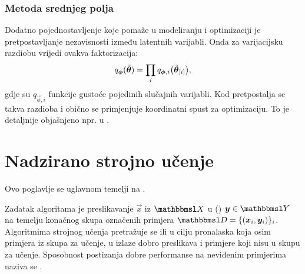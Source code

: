 \documentclass[utf8, diplomski, lmodern]{fer}
\begin{document}
\subsection{Metoda srednjeg polja}

Dodatno pojednostavljenje koje pomaže u modeliranju i optimizaciji je pretpostavljanje nezavisnosti između latentnih varijabli. Onda za varijacijsku razdiobu vrijedi ovakva faktorizacija:
\begin{align}
q_{\vec\phi}\del{\tilde{\vec\theta}} = \prod_i q_{\vec\phi,i}\del{\tilde{\vec\theta}_\ind{i}},
\end{align}
gdje su $q_{\vec\phi,i}$ funkcije gustoće pojedinih slučajnih varijabli. Kod  pretpostalja se takva razdioba i obično se primjenjuje koordinatni spust za optimizaciju. To je detaljnije objašnjeno npr. u \citet{Murphy:2012:MLPP}.

\iffalse
Neka je, radi kraćeg zapisa, $t\del{\tilde{\vec\theta}} \coloneqq \p(\rvec\theta=\tilde{\vec\theta},\rvec x=\vec x)$. Uz aproksimaciju srednjeg polja donja varijacijska granica postaje
\begin{align}
L_{\vec x}\del{\tilde{\rvec\theta}} 
&= \E_{\tilde{\vec\theta}\sim q_{\vec\phi}}\del{\ln t\del{\tilde{\vec\theta}} - \ln q\del{\tilde{\vec\theta}}}
\\
&= \int\dif{\tilde{\vec\theta}} \del{\prod_i q_i(\tilde{z}_i)}\del{\ln t\del{\tilde{\vec\theta}} - \sum_j \ln q_j(\tilde{z}_j)}
\text{.}
\end{align}
\fi



\chapter{Nadzirano strojno učenje} \label{chap:nadzirano-strojno-ucenje}

Ovo poglavlje se uglavnom temelji na \citet{Snajder:2014:SU,Goodfellow:2016:DL}.

Zadatak algoritama  je preslikavanje  $\vec x$ iz  $\set{X}$ u  () $\vec y\in\set{Y}$ na temelju konačnog skupa označenih primjera $\set{D} = \cbr{\del{\vec x_i,\vec y_i}}_{i}$. Algoritmima strojnog učenja pretražuje se  ili  u cilju pronalaska  koja osim primjera iz skupa za učenje, u izlaze dobro preslikava i primjere koji nisu u skupu za učenje. Sposobnost postizanja dobre performanse na neviđenim primjerima naziva se .
\end{document}
